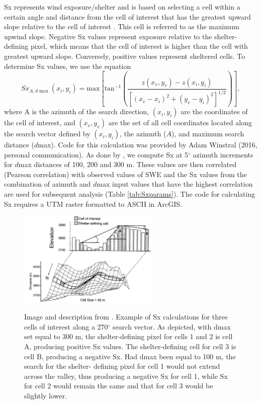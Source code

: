 \documentclass{sfuthesis}
\begin{document}
Sx represents wind exposure/shelter and is based on selecting a cell within a certain angle and distance from the cell of interest that has the greatest upward slope relative to the cell of interest \citep{Winstral2002}. This cell is referred to as the maximum upwind slope. Negative Sx values represent exposure relative to the shelter-defining pixel, which means that the cell of interest is higher than the cell with greatest upward slope. Conversely, positive values represent sheltered cells. To determine Sx values, we use the equation
\begin{equation}
Sx_{A, d\max}(x_i, y_i) = \textrm{max} \left[ \textrm{tan}^{-1} \left( \frac{z(x_v,y_v)-z(x_i,y_i)}{[(x_v-x_i)^2+(y_v-y_i)^2]^{1/2}} \right) \right] ,
\end{equation}
where A is the azimuth of the search direction, $(x_i, y_i)$ are the coordinates of the cell of interest, and $(x_v, y_v)$ are the set of all cell coordinates located along the search vector defined by	$(x_i, y_i)$, the azimuth ($A$), and maximum search distance ($d$max). Code for this calculation was provided by Adam Winstral (2016, personal communication). As done by \cite{McGrath2015}, we compute Sx at 5$^{\circ}$ azimuth increments for $d$max distances of 100, 200 and 300 m. These values are then correlated (Pearson correlation) with observed values of SWE and the Sx values from the combination of azimuth and $d$max input values that have the highest correlation are used for subsequent analysis (Table \ref{tab:Sxparams}). The code for calculating Sx requires a UTM raster formatted to ASCII in ArcGIS. 

\begin{figure}[h]
	\centering
	\includegraphics[width = 0.6\textwidth]{Sx_infographic.jpeg}\\
	\caption{Image and description from \citep{Winstral2002}. Example of Sx calculations for three cells of interest along a 270$^\circ$ search vector. As depicted, with dmax set equal to 300 m, the shelter-defining pixel for cells 1 and 2 is cell A, producing positive Sx values. The shelter-defining cell for cell 3 is cell B, producing a negative Sx. Had dmax been equal to 100 m, the search for the shelter-
defining  pixel  for  cell  1  would  not  extend  across  the  valley,  thus
producing a negative Sx for cell 1, while Sx for cell 2 would remain
the same and that for cell 3 would be slightly lower.}
	\label{fig:Sx_infographic}
\end{figure}
\end{document}
